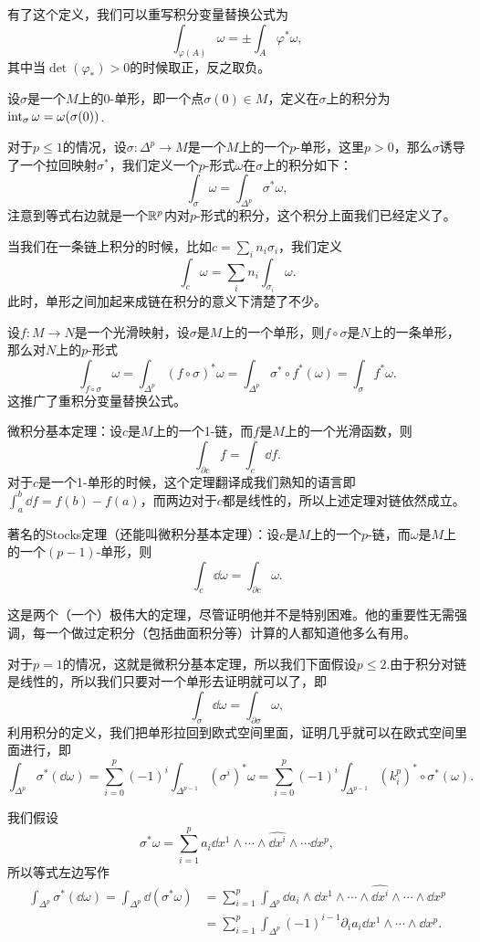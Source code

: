 有了这个定义，我们可以重写积分变量替换公式为
\[
	\int_{\varphi(A)}\omega=\pm\int_A \varphi^*\omega,
\]
其中当$\det(\varphi_*)>0$的时候取正，反之取负。

\para 设$\sigma$是一个$M$上的0-单形，即一个点$\sigma(0)\in M$，定义在$\sigma$上的积分为$\operatorname{int}_\sigma \omega=\omega(\sigma(0))$.

\para 对于$p\leq 1$的情况，设$\sigma:\Delta^p\to M$是一个$M$上的一个$p$-单形，这里$p>0$，那么$\sigma$诱导了一个拉回映射$\sigma^*$，我们定义一个$p$-形式$\omega$在$\sigma$上的积分如下：
\[
	\int_\sigma \omega=\int_{\Delta^p} \sigma^*\omega,
\]
注意到等式右边就是一个$\mathbb{R}^{p}$内对$p$-形式的积分，这个积分上面我们已经定义了。

当我们在一条链上积分的时候，比如$c=\sum_{i} n_i \sigma_i$，我们定义
\[
	\int_c \omega=\sum_i n_i \int_{\sigma_i} \omega.
\]
此时，单形之间加起来成链在积分的意义下清楚了不少。

\para 设$f:M\to N$是一个光滑映射，设$\sigma$是$M$上的一个单形，则$f\circ \sigma$是$N$上的一条单形，那么对$N$上的$p$-形式
\[
	\int_{f\circ\sigma} \omega = \int_{\Delta^p}(f\circ \sigma)^*\omega= \int_{\Delta^p}\sigma^*\circ f^*(\omega)=\int_{\sigma}f^*\omega.
\]
这推广了重积分变量替换公式。

\theo 微积分基本定理：设$c$是$M$上的一个1-链，而$f$是$M$上的一个光滑函数，则
\[
	\int_{\partial c} f=\int_c \dd f.
\]
对于$c$是一个1-单形的时候，这个定理翻译成我们熟知的语言即$\int_a^b \dd f=f(b)-f(a)$，而两边对于$c$都是线性的，所以上述定理对链依然成立。

\theo 著名的Stocks定理（还能叫微积分基本定理）：设$c$是$M$上的一个$p$-链，而$\omega$是$M$上的一个$(p-1)$-单形，则
\[
	\int_c \dd \omega=\int_{\partial c} \omega.
\]

这是两个（一个）极伟大的定理，尽管证明他并不是特别困难。他的重要性无需强调，每一个做过定积分（包括曲面积分等）计算的人都知道他多么有用。

\proof 对于$p=1$的情况，这就是微积分基本定理，所以我们下面假设$p\leq 2$.由于积分对链是线性的，所以我们只要对一个单形去证明就可以了，即
\[
	\int_{\sigma} \dd \omega=\int_{\partial \sigma} \omega,
\]
利用积分的定义，我们把单形拉回到欧式空间里面，证明几乎就可以在欧式空间里面进行，即
\[
	\int_{\Delta^p} \sigma^*(\dd \omega)=\sum_{i=0}^p(-1)^i\int_{\Delta^{p-1}} (\sigma^i)^*\omega=\sum_{i=0}^p(-1)^i\int_{\Delta^{p-1}} (k^p_i)^*\circ \sigma^*(\omega).
\]

我们假设
\[
	\sigma^*\omega=\sum_{i=1}^pa_i\dd x^1\wedge\cdots\wedge\widehat{\dd x^i}\wedge\cdots \dd x^p,
\]
所以等式左边写作
\[
\begin{split}
	\int_{\Delta^p} \sigma^*(\dd \omega)=\int_{\Delta^p} \dd(\sigma^* \omega)&=\sum_{i=1}^p\int_{\Delta^{p}} \dd a_i\wedge \dd x^1\wedge\cdots\wedge\widehat{\dd x^i}\wedge\cdots\wedge\dd x^p\\
	&=\sum_{i=1}^p\int_{\Delta^{p}} (-1)^{i-1}\partial_i a_i\dd x^1\wedge\cdots \wedge\dd x^p.
\end{split}
\]


